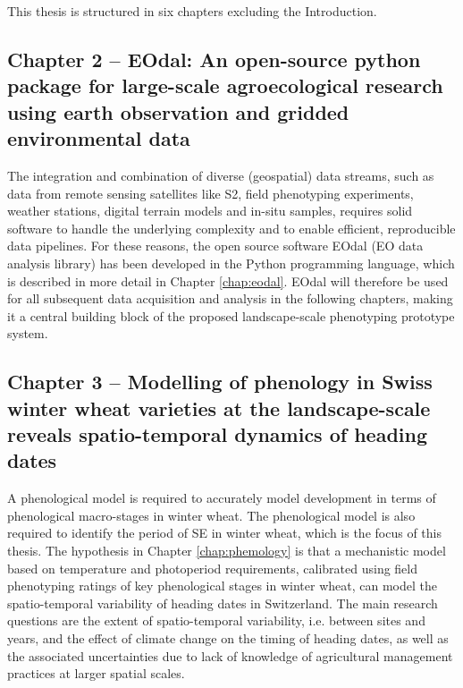 This thesis is structured in six chapters excluding the Introduction.

\subsection*{Chapter 2 -- EOdal: An open-source python package for large-scale agroecological research using earth observation and gridded environmental data}
The integration and combination of diverse (geospatial) data streams, such as data from remote sensing satellites like \gls{S2}, field phenotyping experiments, weather stations, digital terrain models and in-situ samples, requires solid software to handle the underlying complexity and to enable efficient, reproducible data pipelines. For these reasons, the open source software EOdal (\gls{EO} data analysis library) has been developed in the Python programming language, which is described in more detail in Chapter \ref{chap:eodal}. EOdal will therefore be used for all subsequent data acquisition and analysis in the following chapters, making it a central building block of the proposed landscape-scale phenotyping prototype system.

\subsection*{Chapter 3 -- Modelling of phenology in Swiss winter wheat varieties at the landscape-scale reveals spatio-temporal dynamics of heading dates}
A phenological model is required to accurately model development in terms of phenological macro-stages in winter wheat. The phenological model is also required to identify the period of \gls{SE} in winter wheat, which is the focus of this thesis. The hypothesis in Chapter \ref{chap:phemology} is that a mechanistic model based on temperature and photoperiod requirements, calibrated using field phenotyping ratings of key phenological stages in winter wheat, can model the spatio-temporal variability of heading dates in Switzerland. The main research questions are the extent of spatio-temporal variability, i.e. between sites and years, and the effect of climate change on the timing of heading dates, as well as the associated uncertainties due to lack of knowledge of agricultural management practices at larger spatial scales.

